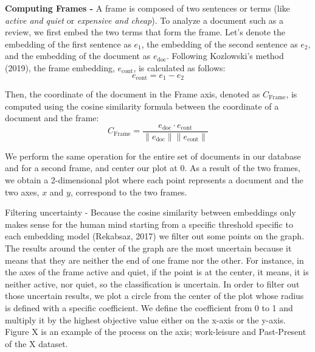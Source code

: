 \documentclass{article}
\begin{document}
\textbf{Computing Frames -} A frame is composed of two sentences or terms (like \textit{active and quiet} or \textit{expensive and cheap}). To analyze a document such as a review, we first embed the two terms that form the frame. Let's denote the embedding of the first sentence as \( e_1 \), the embedding of the second sentence as \( e_2 \), and the embedding of the document as \( e_{\text{doc}} \). Following Kozlowski's method (2019), the frame embedding, \( e_{\text{cont}} \), is calculated as follows:
\[
e_{\text{cont}} = e_1 - e_2
\]

Then, the coordinate of the document in the Frame axis, denoted as \( C_{\text{Frame}} \), is computed using the cosine similarity formula between the coordinate of a document and the frame:
\[
C_{\text{Frame}} = \frac{e_{\text{doc}} \cdot e_{\text{cont}}}{\|e_{\text{doc}}\| \|e_{\text{cont}}\|}
\]

We perform the same operation for the entire set of documents in our database and for a second frame, and center our plot at 0. As a result of the two frames, we obtain a 2-dimensional plot where each point represents a document and the two axes, \(x\) and \(y\), correspond to the two frames.


Filtering uncertainty - Because the cosine similarity between embeddings only makes sense for the human mind starting from a specific threshold specific to each embedding model  (Rekabsaz, 2017) we filter out some points on the graph. The results around the center of the graph are the most uncertain because it means that they are neither the end of one frame nor the other. For instance, in the axes of the frame active and quiet,  if the point is at the center, it means, it is neither active, nor quiet, so the classification is uncertain. In order to filter out those uncertain results, we plot a circle from the center of the plot whose radius is defined with a specific coefficient. We define the coefficient from 0 to 1 and multiply it by the highest objective value either on the x-axis or the y-axis.  Figure X is an example of the process on the axis; work-leisure and Past-Present of the X dataset.
\end{document}
